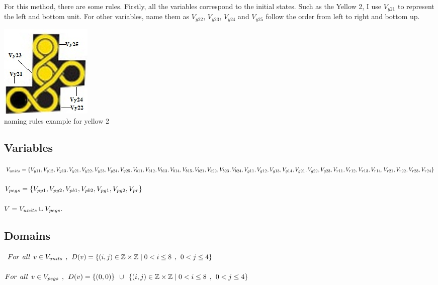 For this method, there are some rules. Firstly, all the variables correspond to the initial states. Such as the Yellow 2, I use $V_{y21}$ to represent the left and bottom unit. For other variables, name them as $V_{y22}$, $V_{y23}$, $V_{y24}$ and $V_{y25}$ follow the order from left to right and bottom up.
\begin{center}
\includegraphics{example.jpg}
\\naming rules example for yellow 2
\end{center}
\subsection{Variables}
$V_{units}=\{ V_{y11},V_{y12},
V_{y13},V_{y21},V_{y22},V_{y23},V_{y24},V_{y25},\\V_{b11},V_{b12},V_{b13},V_{b14},
V_{b15},V_{b21},V_{b22},V_{b23},\\V_{b24},V_{g11},V_{g12},V_{g13},V_{g14},V_{g21},V_{g22},V_{g23},\\V_{r11},
V_{r12},V_{r13},V_{r14},V_{r21},V_{r22},V_{r23},V_{r24}\}$\\
\\$V_{pegs} = \{V_{py1}, V_{py2}, V_{pb1}, V_{pb2}, V_{pg1}, V_{pg2}, V_{pr}\}$\\
\\$V = V_{units} \cup V_{pegs}.$
\subsection{Domains}
$For \hspace{1ex} all \hspace{1ex} v \in V_{units} \hspace{1ex},\hspace{1ex} D(v)=\{(i,j) \in \mathbb{Z} \times \mathbb{Z}	\mid  0<i \leq 8 \hspace{1ex} , \hspace{1ex} 0<j \leq 4\}$\\
\\
$For \hspace{1ex} all \hspace{1ex} v \in V_{pegs} \hspace{1ex},\hspace{1ex} D(v)=\{(0,0)\} \hspace{1ex} \cup \hspace{1ex}\{(i,j) \in \mathbb{Z} \times \mathbb{Z}\mid  0<i \leq 8 \hspace{1ex} , \hspace{1ex} 0<j \leq 4\}$
